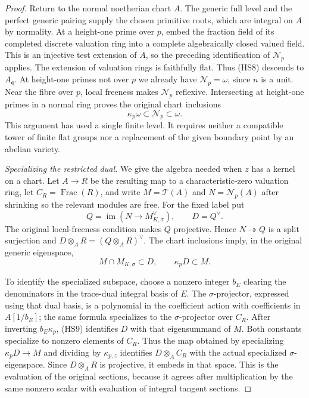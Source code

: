 \begin{proof}
Return to the normal noetherian chart $A$. The generic full level
and the perfect generic pairing supply the chosen primitive roots,
which are integral on $A$ by normality. At a height-one prime over
$p$, embed the fraction field of its completed discrete valuation
ring into a complete algebraically closed valued field. This is an
injective test extension of $A$, so the preceding identification
of $\mathcal N_p$ applies. The extension of valuation rings is
faithfully flat. Thus \textup{(HS8)} descends to $A_{\mathfrak q}$.
At height-one primes not over $p$ we already have
$\mathcal N_p=\omega$, since $n$ is a unit. Near the fibre over
$p$, local freeness makes $\mathcal N_p$ reflexive. Intersecting
at height-one primes in a normal ring proves the original chart
inclusions
\begin{equation}\label{eq:hodge-chart-inclusions}
 \kappa_p\omega\subset\mathcal N_p\subset\omega.
\end{equation}
This argument has used a single finite level. It requires neither
a compatible tower of finite flat groups nor a replacement of the
given boundary point by an abelian variety.

\emph{Specializing the restricted dual.}
We give the algebra needed when $z$ has a kernel on a chart.
Let $A\to R$ be the resulting map to a characteristic-zero
valuation ring, let $C_R=\operatorname{Frac}(R)$, and write
$M=\mathcal T(A)$ and $N=\mathcal N_p(A)$ after shrinking so the
relevant modules are free. For the fixed label put
\[
 Q=\operatorname{im}(N\longrightarrow M_{K,\sigma}^{\vee}),
 \qquad D=Q^\vee.
\]
The original local-freeness condition makes $Q$ projective. Hence
$N\twoheadrightarrow Q$ is a split surjection and
$D\otimes_A R=(Q\otimes_A R)^\vee$.
The chart inclusions imply, in the original generic eigenspace,
\[
 M\cap M_{K,\sigma}\subset D,\qquad \kappa_p D\subset M.
 \tag{HS9}
\]

To identify the specialized subspace, choose a nonzero integer
$b_E$ clearing the denominators in the trace-dual integral basis
of $E$. The $\sigma$-projector, expressed using that dual basis,
is a polynomial in the coefficient action with coefficients in
$A[1/b_E]$; the same formula specializes to the $\sigma$-projector
over $C_R$. After inverting $b_E\kappa_p$, \textup{(HS9)}
identifies $D$ with that eigensummand of $M$. Both constants
specialize to nonzero elements of $C_R$. Thus the map obtained by
specializing $\kappa_p D\to M$ and dividing by $\kappa_{p,z}$
identifies $D\otimes_A C_R$ with the actual specialized
$\sigma$-eigenspace. Since $D\otimes_A R$ is projective, it
embeds in that space. This is the evaluation of the original
sections, because it agrees after multiplication by the same
nonzero scalar with evaluation of integral tangent sections.


\end{proof}
